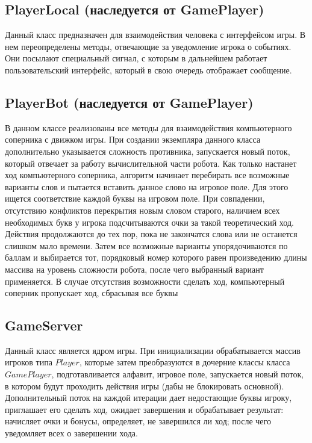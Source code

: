 \documentclass[a4paper,14pt]{article}
\begin{document}
	\subsection[PlayerLocal]{PlayerLocal (наследуется от GamePlayer)}
	Данный класс предназначен для взаимодействия человека с интерфейсом игры. В нем переопределены методы, отвечающие за уведомление игрока о событиях. Они посылают специальный сигнал, с которым в дальнейшем работает пользовательский интерфейс, который в свою очередь отображает сообщение.
	
	\subsection[PlayerBot]{PlayerBot (наследуется от GamePlayer)}
	В данном классе реализованы все методы для взаимодействия компьютерного соперника с движком игры. При создании экземпляра данного класса дополнительно указывается сложность противника, запускается новый поток, который отвечает за работу вычислительной части робота. Как только настанет ход компьютерного соперника, алгоритм начинает перебирать все возможные варианты слов и пытается вставить данное слово на игровое поле. Для этого ищется соответствие каждой буквы на игровом поле. При совпадении, отсутствию конфликтов перекрытия новым словом старого, наличием всех необходимых букв у игрока подсчитываются очки за такой теоретический ход. Действия продолжаются до тех пор, пока не закончатся слова или не останется слишком мало времени. Затем все возможные варианты упорядочиваются по баллам и выбирается тот, порядковый номер которого равен произведению длины массива на уровень сложности робота, после чего выбранный вариант применяется. В случае отсутствия возможности сделать ход, компьютерный соперник пропускает ход, сбрасывая все буквы
	
	\subsection{GameServer}
	Данный класс является ядром игры. При инициализации обрабатывается массив игроков типа $Player$, которые затем преобразуются в дочерние классы класса $GamePlayer$, подготавливается алфавит, игровое поле, запускается новый поток, в котором будут проходить действия игры (дабы не блокировать основной). Дополнительный поток на каждой итерации дает недостающие буквы игроку, приглашает его сделать ход, ожидает завершения и обрабатывает результат: начисляет очки и бонусы, определяет, не завершился ли ход; после чего уведомляет всех о завершении хода.
	
\end{document}
